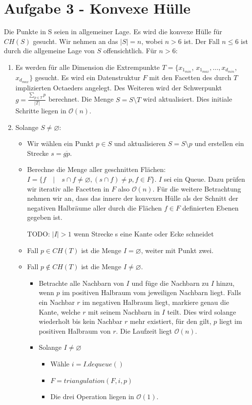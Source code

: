\documentclass[a4paper]{article}
\begin{document}
\section*{Aufgabe 3 - Konvexe Hülle}

Die Punkte in S seien in allgemeiner Lage. Es wird die konvexe Hülle für $CH(S)$ gesucht. Wir nehmen an das $|S| = n$, wobei $n > 6$ ist. Der Fall $n \leq 6$ ist durch die allgemeine Lage von $S$ offensichtlich. Für $n > 6$:

\begin{enumerate}
	\item Es werden für alle Dimension die Extrempunkte $T  = \{x_{1_{min}}$, $x_{1_{max}}, \dots, x_{d_{min}}$, $x_{d_{max}}\}$ gesucht. Es wird ein Datenstruktur $F$ mit den Facetten des durch $T$ implizierten Octaeders angelegt. Des Weiteren wird der Schwerpunkt $g = \frac{\sum_{p \in T}{ p } }{|T|}$ berechnet. Die Menge $S = S \setminus T$ wird aktualisiert. Dies initiale Schritte liegen in $\mathcal{O}(n)$.
	\item Solange $S \neq \varnothing$:

	\begin{itemize}
		\item Wir wählen ein Punkt $p \in S$ und aktualisieren $S = S \setminus p$ und erstellen ein Strecke $s = \overline{gp}$.
		
		\item Berechne die Menge aller geschnitten Flächen: $I = \{f \quad | \quad s \cap f \neq \varnothing, (s \cap f) \neq p, f \in F\}$. $I$ sei ein Queue. Dazu prüfen wir iterativ alle Facetten in $F$ also $\mathcal{O}(n)$. Für die weitere Betrachtung nehmen wir an, dass das innere der konvexen Hülle als der Schnitt der negativen Halbräume aller
		durch die Flächen $f \in F$ definierten Ebenen gegeben ist.
		
		TODO: $|I| > 1$ wenn Strecke s eine Kante oder Ecke schneidet
		
		\item Fall $p \in CH(T)$ ist die Menge $I = \varnothing$, weiter mit Punkt zwei.
		\item Fall $p \notin CH(T)$ ist die Menge $I \neq \varnothing$. 
		\begin{itemize}
			\item Betrachte alle Nachbarn von $I$ und füge die Nachbarn zu $I$ hinzu, wenn $p$ im positiven Halbraum vom jeweiligen Nachbarn liegt. Falls ein Nachbar $r$ im negativen
Halbraum liegt, markiere genau die Kante, welche $r$ mit seinem Nachbarn in $I$ teilt. Dies wird solange wiederholt bis kein Nachbar $r$ mehr existiert, für den gilt, $p$ liegt im positiven Halbraum von $r$.  Die Laufzeit liegt $\mathcal{O}(n)$. 
			\item  Solange $I \neq \varnothing$
			\begin{itemize}
				\item Wähle $i = I.dequeue()$
				\item $F = triangulation(F,i,p)$ 
				\item Die drei Operation liegen in $\mathcal{O}(1)$.
			\end{itemize}
		\end{itemize}
		

\end{itemize}
\end{enumerate}
\end{document}
